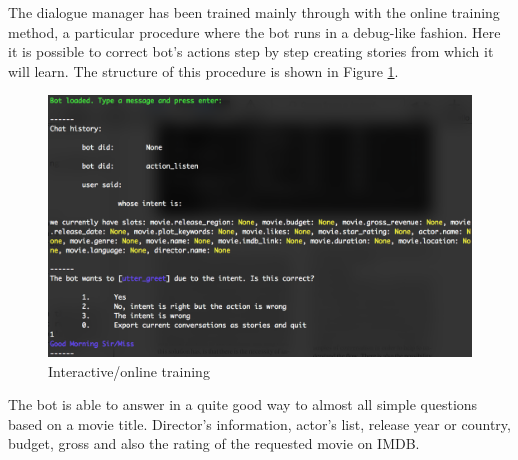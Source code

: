 \documentclass[11pt,a4paper]{article}
\begin{document}
The dialogue manager has been trained mainly through with the online training method, a particular procedure where the bot runs in a debug-like fashion. Here it is possible to correct bot's actions step by step creating stories from which it will learn. The structure of this procedure is shown in Figure \ref{fig:hist}.

\begin{figure}[h]
	\centering
	\includegraphics[width=.5\textwidth]{images/history}
	\caption{Interactive/online training}
	\label{fig:hist}
\end{figure}

The bot is able to answer in a quite good way to almost all simple questions based on a movie title. Director's information, actor's list, release year or country, budget, gross and also the rating of the requested movie on IMDB.
\end{document}
